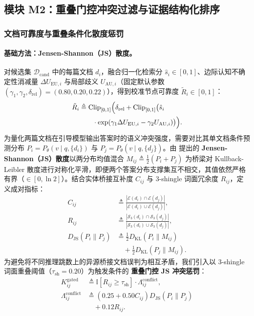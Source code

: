 \documentclass[11pt]{article}
\begin{document}
\subsection{模块 M2：重叠门控冲突过滤与证据结构化排序}

\subsubsection{文档可靠度与重叠条件化散度惩罚}
\paragraph{基础方法：Jensen-Shannon（JS）散度。}
对候选集 $\mathcal{D}_{\text{cand}}$ 中的每篇文档 $d_i$，融合归一化检索分 $\hat{s}_i \in [0, 1]$、边际认知不确定性消减量 $\Delta U_{\text{EU}, i}$ 与局部歧义 $U_{\text{AU}, i}$（固定默认参数 $(\gamma_1, \gamma_2, \delta_{\text{rel}}) = (0.80, 0.20, 0.22)$），得到校准节点可靠度 $\tilde{R}_i \in [0, 1]$：
\begin{align}
\tilde{R}_i &\triangleq \text{Clip}_{[0, 1]}\Bigl( \delta_{\text{rel}} + \text{Clip}_{[0, 1]}\bigl( \hat{s}_i \nonumber \\
&\qquad \cdot \exp(\gamma_1 \Delta U_{\text{EU}, i} - \gamma_2 U_{\text{AU}, i}) \bigr) \Bigr).
\label{eq:zh_m2_rel}
\end{align}
为量化两篇文档在引导模型输出答案时的语义冲突强度，需要对比其单文档条件预测分布 $P_i = P_{\theta}(v \mid q, \{d_i\})$ 与 $P_j = P_{\theta}(v \mid q, \{d_j\})$。由 \citet{lin1991divergence} 提出的 \textbf{Jensen-Shannon（JS）散度}以两分布均值混合 $M_{ij} \triangleq \frac{1}{2}(P_i + P_j)$ 为桥梁对 Kullback-Leibler 散度进行对称化平滑，即便两个答案分布支撑集互不相交，其值依然严格有界（$\in [0, \ln 2]$）。结合实体桥接互补度 $C_{ij}$ 与 3-shingle 词面冗余度 $R_{ij}$，定义成对指标：
\begin{align}
C_{ij} &\triangleq \frac{|\mathcal{E}(d_i) \cap \mathcal{E}(d_j)|}{|\mathcal{E}(d_i) \cup \mathcal{E}(d_j)|}, \label{eq:zh_m2_c} \\
R_{ij} &\triangleq \frac{|\mathcal{S}_3(d_i) \cap \mathcal{S}_3(d_j)|}{|\mathcal{S}_3(d_i) \cup \mathcal{S}_3(d_j)|}, \label{eq:zh_m2_cr} \\
D_{\text{JS}}(P_i \parallel P_j) &\triangleq \tfrac{1}{2}D_{\text{KL}}(P_i \parallel M_{ij}) \nonumber \\
&\quad + \tfrac{1}{2}D_{\text{KL}}(P_j \parallel M_{ij}). \label{eq:zh_m2_djs}
\end{align}
为避免将不同推理跳数上的异源桥接文档误判为相互矛盾，我们引入以 3-shingle 词面重叠阈值（$\tau_{\text{sh}} = 0.20$）为触发条件的 \textbf{重叠门控 JS 冲突惩罚}：
\begin{align}
K_{ij}^{\text{gated}} &\triangleq \mathbb{I}[R_{ij} \ge \tau_{\text{sh}}] \cdot \Lambda_{ij}^{\text{conflict}}, \label{eq:zh_m2_gated} \\
\Lambda_{ij}^{\text{conflict}} &\triangleq (0.25 + 0.50 C_{ij}) D_{\text{JS}}(P_i \parallel P_j) \nonumber \\
&\quad + 0.12 R_{ij}. \nonumber
\end{align}
\end{document}
